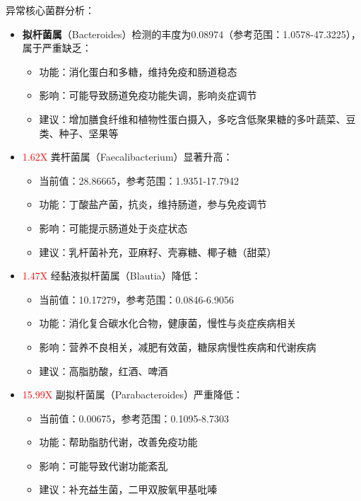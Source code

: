 \documentclass[UTF8]{ctexart}
\begin{document}
\begin{tcolorbox}[
    enhanced,
    colback=gray!3,
    colframe=gray!3,
    arc=3mm,
    boxrule=0pt,
    width=\textwidth,
    top=8pt,
    bottom=8pt
]
{\small{\textcolor{yellow!85!orange}{\faLightbulb}}\quad 异常核心菌群分析：

\begin{itemize}
    \item \textbf{拟杆菌属}（Bacteroides）检测的丰度为0.08974（参考范围：1.0578-47.3225），属于严重\textcolor{customred}{缺乏}：
    \begin{itemize}
        \item 功能：消化蛋白和多糖，维持免疫和肠道稳态
        \item 影响：可能导致肠道免疫功能失调，影响炎症调节
        \item 建议：增加膳食纤维和植物性蛋白摄入，多吃含低聚果糖的多叶蔬菜、豆类、种子、坚果等
    \end{itemize}

    \item {\textcolor{red}{1.62X}} 粪杆菌属（Faecalibacterium）显著升高：
    \begin{itemize}
        \item 当前值：28.86665，参考范围：1.9351-17.7942
        \item 功能：丁酸盐产菌，抗炎，维持肠道，参与免疫调节
        \item 影响：可能提示肠道处于炎症状态
        \item 建议：乳杆菌补充，亚麻籽、壳寡糖、椰子糖（甜菜）
    \end{itemize}

    \item {\textcolor{red}{1.47X}} 经黏液拟杆菌属（Blautia）降低：
    \begin{itemize}
        \item 当前值：10.17279，参考范围：0.0846-6.9056
        \item 功能：消化复合碳水化合物，健康菌，慢性与炎症疾病相关
        \item 影响：营养不良相关，减肥有效菌，糖尿病慢性疾病和代谢疾病
        \item 建议：高脂肪酸，红酒、啤酒
    \end{itemize}

    \item {\textcolor{red}{15.99X}} 副拟杆菌属（Parabacteroides）严重降低：
    \begin{itemize}
        \item 当前值：0.00675，参考范围：0.1095-8.7303
        \item 功能：帮助脂肪代谢，改善免疫功能
        \item 影响：可能导致代谢功能紊乱
        \item 建议：补充益生菌，二甲双胺氧甲基吡嗪
    \end{itemize}


\end{itemize}}
\end{tcolorbox}
\end{document}
